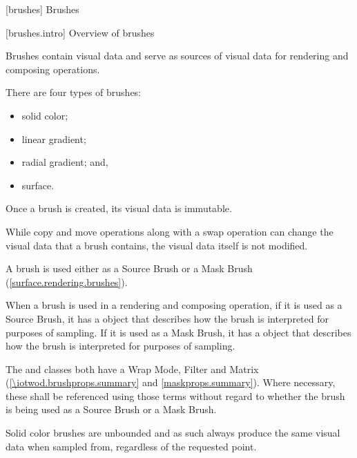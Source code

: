 
 [brushes] {Brushes}

 [brushes.intro] {Overview of brushes}

\pnum
Brushes contain visual data and serve as sources of visual data for rendering and composing operations.

\pnum
There are four types of brushes:
\begin{itemize}
	\item solid color;
	\item linear gradient;
	\item radial gradient; and,
	\item surface.
\end{itemize}

\pnum
Once a brush is created, its visual data is immutable.

\pnum
\begin{note}
While copy and move operations along with a swap operation can change the visual data that a brush contains, the visual data itself is not modified.
\end{note}

\pnum
A brush is used either as a Source Brush or a Mask Brush (\ref{surface.rendering.brushes}).

\pnum
When a brush is used in a rendering and composing operation, if it is used as a Source Brush, it has a  object that describes how the brush is interpreted for purposes of sampling. If it is used as a Mask Brush, it has a  object that describes how the brush is interpreted for purposes of sampling.

\pnum
The  and  classes both have a Wrap Mode, Filter and Matrix (\ref{\iotwod.brushprops.summary} and \ref{maskprops.summary}). Where necessary, these shall be referenced using those terms without regard to whether the brush is being used as a Source Brush or a Mask Brush.


%
%
%
%
%
%
\pnum
Solid color brushes are unbounded and as such always produce the same visual data when sampled from, regardless of the requested point.

